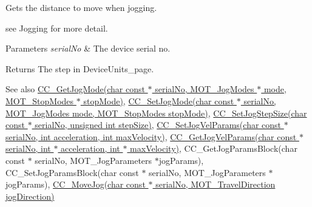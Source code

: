 Gets the distance to move when jogging. 

see Jogging for more detail.


\begin{DoxyParams}{Parameters}
{\em serial\+No} & The device serial no. \\
\hline
\end{DoxyParams}
\begin{DoxyReturn}{Returns}
The step in Device\+Units\+\_\+page. 
\end{DoxyReturn}
\begin{DoxySeeAlso}{See also}
\hyperlink{group___t_cube_d_c_servo_gaacfbbd68c53986e570e3bae02dc51fb4}{C\+C\+\_\+\+Get\+Jog\+Mode(char const $\ast$ serial\+No, M\+O\+T\+\_\+\+Jog\+Modes $\ast$ mode, M\+O\+T\+\_\+\+Stop\+Modes $\ast$ stop\+Mode)}, \hyperlink{group___t_cube_d_c_servo_ga013112148bf91f95324e635b4120f12b}{C\+C\+\_\+\+Set\+Jog\+Mode(char const $\ast$ serial\+No, M\+O\+T\+\_\+\+Jog\+Modes mode, M\+O\+T\+\_\+\+Stop\+Modes stop\+Mode)}, \hyperlink{group___t_cube_d_c_servo_gaeda0e9fdff1b32718f17907d131ddb41}{C\+C\+\_\+\+Set\+Jog\+Step\+Size(char const $\ast$ serial\+No, unsigned int step\+Size)}, \hyperlink{group___t_cube_d_c_servo_gabbacbf91ca765914ea7459863ed3fa9a}{C\+C\+\_\+\+Set\+Jog\+Vel\+Params(char const $\ast$ serial\+No, int acceleration, int max\+Velocity)}, \hyperlink{group___t_cube_d_c_servo_gad414392680335ffaf46aff16c7302533}{C\+C\+\_\+\+Get\+Jog\+Vel\+Params(char const $\ast$ serial\+No, int $\ast$ acceleration, int $\ast$ max\+Velocity)}, C\+C\+\_\+\+Get\+Jog\+Params\+Block(char const $\ast$ serial\+No, M\+O\+T\+\_\+\+Jog\+Parameters $\ast$jog\+Params), C\+C\+\_\+\+Set\+Jog\+Params\+Block(char const $\ast$ serial\+No, M\+O\+T\+\_\+\+Jog\+Parameters $\ast$jog\+Params), \hyperlink{group___t_cube_d_c_servo_ga9bc703ed477544bba6be72e9b8052083}{C\+C\+\_\+\+Move\+Jog(char const $\ast$ serial\+No, M\+O\+T\+\_\+\+Travel\+Direction jog\+Direction)}


\end{DoxySeeAlso}

\begin{DoxyCodeInclude}
\end{DoxyCodeInclude}
